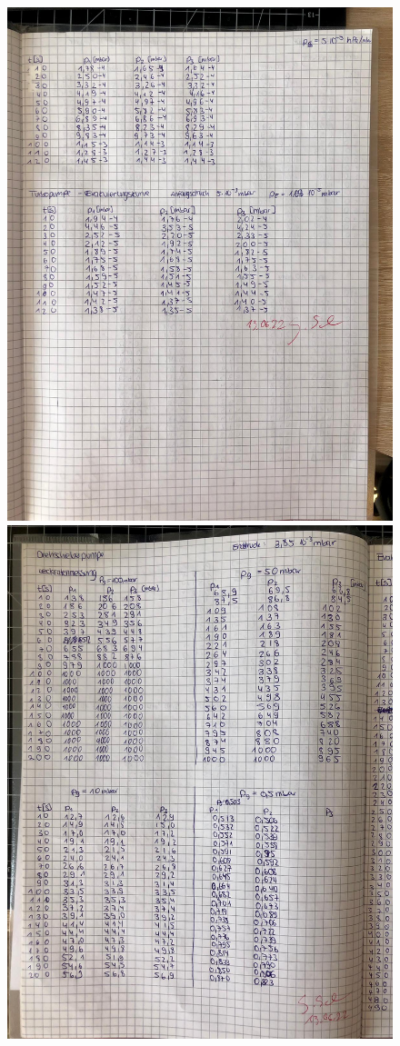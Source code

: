 \begin{figure}
    \includegraphics[width=\textwidth]{bilder/Anhang2.jpg}
    \includegraphics[width=\textwidth]{bilder/Anhang3.jpg}

\end{figure}
